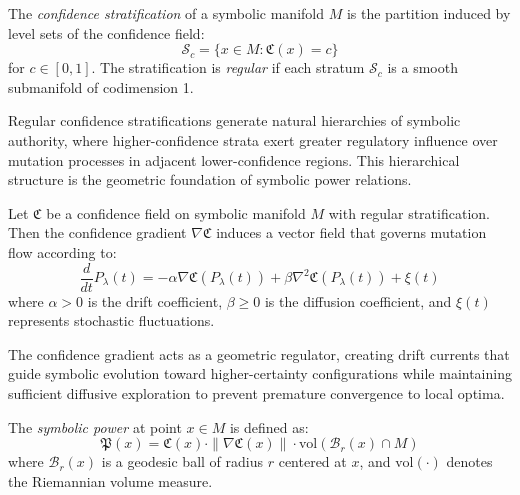\begin{definition}
\label{definition:bk6_confidence_stratification}
The \emph{confidence stratification} of a symbolic manifold $M$ is the partition induced by level sets of the confidence field:
\begin{equation}
\mathcal{S}_c = \{x \in M : \mathfrak{C}(x) = c\}
\end{equation}
for $c \in [0,1]$. The stratification is \emph{regular} if each stratum $\mathcal{S}_c$ is a smooth submanifold of codimension 1.
\end{definition}

Regular confidence stratifications generate natural hierarchies of symbolic authority, where higher-confidence strata exert greater regulatory influence over mutation processes in adjacent lower-confidence regions. This hierarchical structure is the geometric foundation of symbolic power relations.

\begin{proposition}
\label{proposition:bk6_confidence_gradient}
Let $\mathfrak{C}$ be a confidence field on symbolic manifold $M$ with regular stratification. Then the confidence gradient $\nabla \mathfrak{C}$ induces a vector field that governs mutation flow according to:
\begin{equation}
\frac{d}{dt} P_\lambda(t) = -\alpha \nabla \mathfrak{C}(P_\lambda(t)) + \beta \nabla^2 \mathfrak{C}(P_\lambda(t)) + \xi(t)
\end{equation}
where $\alpha > 0$ is the drift coefficient, $\beta \geq 0$ is the diffusion coefficient, and $\xi(t)$ represents stochastic fluctuations.
\end{proposition}

The confidence gradient acts as a geometric regulator, creating drift currents that guide symbolic evolution toward higher-certainty configurations while maintaining sufficient diffusive exploration to prevent premature convergence to local optima.

\begin{definition}
\label{definition:bk6_symbolic_power}
The \emph{symbolic power} at point $x \in M$ is defined as:
\begin{equation}
\mathfrak{P}(x) = \mathfrak{C}(x) \cdot \|\nabla \mathfrak{C}(x)\| \cdot \text{vol}(\mathcal{B}_r(x) \cap M)
\end{equation}
where $\mathcal{B}_r(x)$ is a geodesic ball of radius $r$ centered at $x$, and $\text{vol}(\cdot)$ denotes the Riemannian volume measure.
\end{definition}

